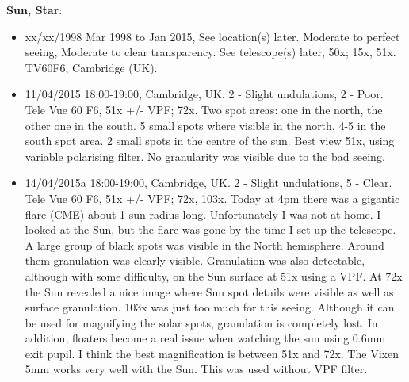 {\bf Sun, Star}:
\begin{itemize}
\item xx/xx/1998 Mar 1998 to Jan 2015, See location(s) later. Moderate to perfect seeing, Moderate to clear transparency. See telescope(s) later, 50x; 15x, 51x. TV60F6, Cambridge (UK).
\item 11/04/2015 18:00-19:00, Cambridge, UK. 2 - Slight undulations, 2 - Poor. Tele Vue 60 F6, 51x +/- VPF; 72x. Two spot areas: one in the north, the other one in the south. 5 small spots where visible in the north, 4-5 in the south spot area. 2 small spots in the centre of the sun. Best view 51x, using variable polarising filter. No granularity was visible due to the bad seeing.
\item 14/04/2015a 18:00-19:00, Cambridge, UK. 2 - Slight undulations, 5 - Clear. Tele Vue 60 F6, 51x +/- VPF; 72x, 103x. Today at 4pm there was a gigantic flare (CME) about 1 sun radius long. Unfortunately I was not at home. I looked at the Sun, but the flare was gone by the time I set up the telescope. A large group of black spots was visible in the North hemisphere. Around them granulation was clearly visible. Granulation was also detectable, although with some difficulty, on the Sun surface at 51x using a VPF. At 72x the Sun revealed a nice image where Sun spot details were visible as well as surface granulation. 103x was just too much for this seeing. Although it can be used for magnifying the solar spots, granulation is completely lost. In addition, floaters become a real issue when watching the sun using 0.6mm exit pupil. I think the best magnification is between 51x and 72x. The Vixen 5mm works very well with the Sun. This was used without VPF filter.

\end{itemize}
